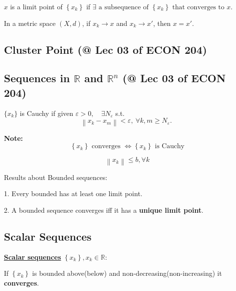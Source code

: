 \documentclass[11pt]{elegantbook}
\begin{document}
\begin{definition}
    $x$ is a limit point of $\left\{x_{k}\right\}$ if $\exists \text { a subsequence of }\left\{x_{k}\right\} \text { that converges to } x$.
    \end{definition}
\begin{theorem}
    In a metric space $(X, d)$, if $x_{k} \rightarrow x$ and $x_{k} \rightarrow x'$, then $x=x'$.
\end{theorem}

\subsection{Cluster Point \small{(@ Lec 03 of ECON 204)}}

\subsection{Sequences in $\mathbb{R}$ and $\mathbb{R}^n$ \small{(@ Lec 03 of ECON 204)}}

\begin{definition}
    $\{x_k\}$ is Cauchy if given $\varepsilon>0, \quad \exists N_{\varepsilon}$ s.t.
    $$\left\|x_{k}-x_{m}\right\|<\varepsilon,\  \forall k, m \geqslant N_{\varepsilon} \text {. }$$
\end{definition}
\textbf{Note:}$$\left\{x_{k}\right\} \text { converges } \Longleftrightarrow\left\{x_{k}\right\} \text { is Cauchy}$$


\begin{definition}
    $$\left\|x_{k}\right\| \leqslant b, \forall k$$
\end{definition}

Results about Bounded sequences:

1. Every bounded has at least one limit point.

2. A bounded sequence converges iff it has a \textbf{unique limit point}.

\subsection{Scalar Sequences}
\textbf{\underline{Scalar sequences}} $\left\{x_{k}\right\}, x_{k} \in \mathbb{R}$:
\begin{proposition}
    If $\left\{x_{k}\right\}$ is bounded above(below) and non-decreasing(non-increasing) it \textbf{converges}.
\end{proposition}
\end{document}
